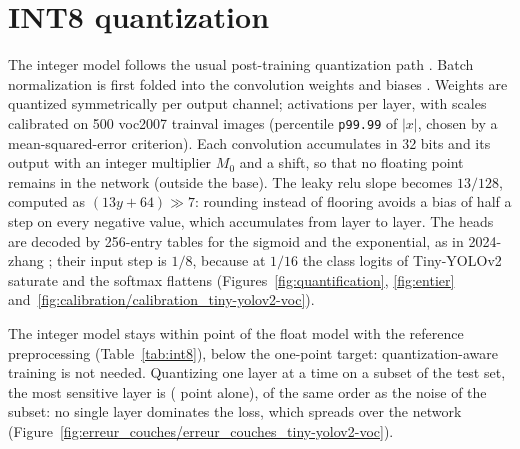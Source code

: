 \documentclass[11pt,a4paper]{article}
\begin{document}
\section{INT8 quantization}\label{sec:quant}

The integer model follows the usual post-training quantization path
\cite[\#008.0]{2607.13106}. Batch normalization is first folded into the convolution
weights and biases \cite[\#039.0]{2023-zhai}. Weights are quantized symmetrically per
output channel; activations per layer, with scales calibrated on 500 \gls{voc}2007 trainval
images (percentile \texttt{p99.99} of $|x|$, chosen by a mean-squared-error criterion).
Each convolution accumulates in 32 bits and  its output with an integer
multiplier $M_0$ and a shift, so that no floating point remains in the network (outside
the \gls{base}). The leaky \gls{relu} slope becomes $13/128$, computed as $(13y+64)\gg7$: rounding
instead of flooring avoids a bias of half a step on every negative value, which
accumulates from layer to layer. The heads are decoded by 256-entry tables for the sigmoid
and the exponential, as in 2024-zhang \cite[\#014.0]{2024-zhang}; their input step is
$1/8$, because at $1/16$ the class logits of Tiny-YOLOv2 saturate and the softmax
flattens (Figures~\ref{fig:quantification}, \ref{fig:entier}
and~\ref{fig:calibration/calibration_tiny-yolov2-voc}).


The integer model stays within  point of the float model with the
reference preprocessing (Table~\ref{tab:int8}), below the one-point target:
quantization-aware training is not needed. Quantizing one layer at a time on a subset of
the test set, the most sensitive layer is 
( point alone), of the same order as the noise of the subset:
no single layer dominates the loss, which spreads over the network
(Figure~\ref{fig:erreur_couches/erreur_couches_tiny-yolov2-voc}).

\begin{table}[htbp]
\caption{\gls{map} of the float and \gls{int8} models on \gls{voc}2007 test
().}
\label{tab:int8}
\small{}
\end{table}

\end{document}
